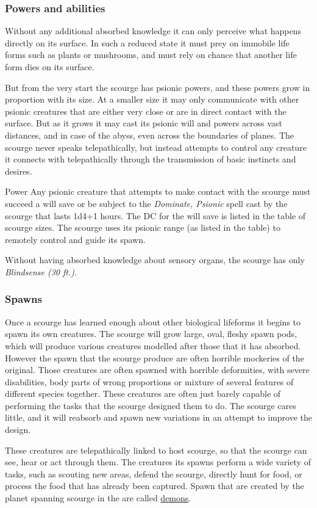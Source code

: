 \subsubsection{Powers and abilities}

Without any additional absorbed knowledge it can only perceive what happens
directly on its surface. In such a reduced state it must prey on immobile life
forms such as plants or mushrooms, and must rely on chance that another life
form dies on its surface.

But from the very start the scourge has psionic powers, and these powers grow
in proportion with its size. At a smaller size it may only communicate with
other psionic creatures that are either very close or are in direct contact
with the surface. But as it grows it may cast its psionic will and powers
across vast distances, and in case of the abyss, even across the boundaries of
planes. The scourge never speaks telepathically, but instead attempts to
control any creature it connects with telepathically through the transmission
of basic instincts and desires.

\begin{35e}{Power}
  Any psionic creature that attempts to make contact with the scourge must
  succeed a will save or be subject to the \emph{Dominate, Psionic} spell
  cast by the scourge that lasts 1d4+1 hours. The DC for the will save is
  listed in the table of scourge sizes. The scourge uses its psionic range (as
  listed in the table) to remotely control and guide its spawn.

  Without having absorbed knowledge about sensory organs, the scourge has
  only \emph{Blindsense (30 ft.)}.
\end{35e}

\subsubsection{Spawns}
\label{sec:Spawns}

Once a scourge has learned enough about other biological lifeforms it begins
to spawn its own creatures. The scourge will grow large, oval, fleshy spawn
pods, which will produce various creatures modelled after those that it has
absorbed. However the spawn that the scourge produce are often horrible
mockeries of the original. Those creatures are often spawned with horrible
deformities, with severe disabilities, body parts of wrong proportions or
mixture of several features of different species together. These creatures are
often just barely capable of performing the tasks that the scourge designed
them to do. The scourge cares little, and it will reabsorb and spawn new
variations in an attempt to improve the design.

These creatures are telepathically linked to host scourge, so that the scourge
can see, hear or act through them. The creatures its spawns perform a wide
variety of tasks, such as scouting new areas, defend the scourge, directly
hunt for food, or process the food that has already been captured. Spawn that
are created by the planet spanning scourge in the  are
called \hyperref[sec:Demons]{demons}.
